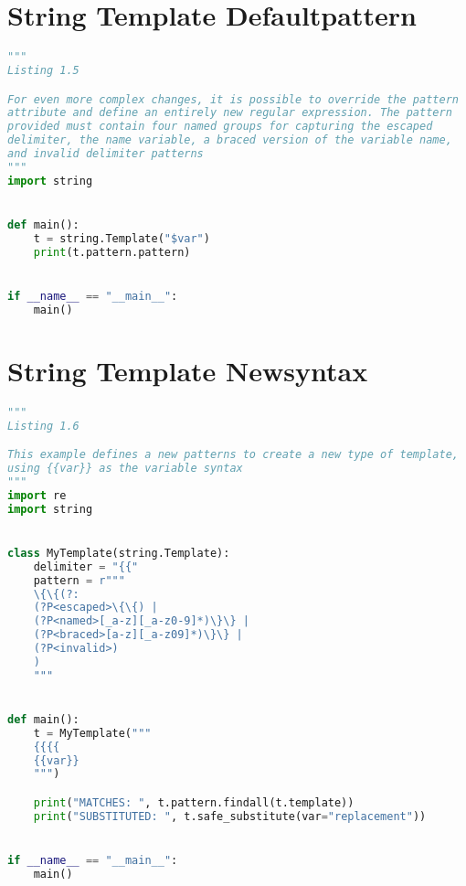\documentclass[a4paper,landscape]{report}
\begin{document}
\section{String Template Defaultpattern}
\begin{lstlisting}[language=Python]
"""
Listing 1.5

For even more complex changes, it is possible to override the pattern
attribute and define an entirely new regular expression. The pattern
provided must contain four named groups for capturing the escaped
delimiter, the name variable, a braced version of the variable name,
and invalid delimiter patterns
"""
import string


def main():
    t = string.Template("$var")
    print(t.pattern.pattern)


if __name__ == "__main__":
    main()

\end{lstlisting}
\section{String Template Newsyntax}
\begin{lstlisting}[language=Python]
"""
Listing 1.6

This example defines a new patterns to create a new type of template,
using {{var}} as the variable syntax
"""
import re
import string


class MyTemplate(string.Template):
    delimiter = "{{"
    pattern = r"""
    \{\{(?:
    (?P<escaped>\{\{) |
    (?P<named>[_a-z][_a-z0-9]*)\}\} |
    (?P<braced>[a-z][_a-z09]*)\}\} |
    (?P<invalid>)
    )
    """


def main():
    t = MyTemplate("""
    {{{{
    {{var}}
    """)

    print("MATCHES: ", t.pattern.findall(t.template))
    print("SUBSTITUTED: ", t.safe_substitute(var="replacement"))


if __name__ == "__main__":
    main()

\end{lstlisting}
\end{document}
